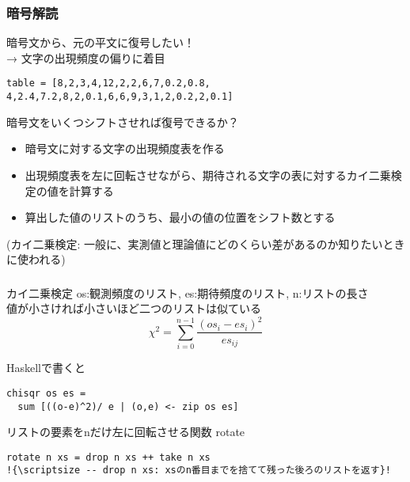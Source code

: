 \documentclass[dvipdfmx,cjk,xcolor=dvipsnames,envcountsect,notheorems,12pt]{beamer}
\theoremstyle{definition}
\begin{document}
\begin{frame}[fragile]
\frametitle{暗号解読}
暗号文から、元の平文に復号したい！
\\ → 文字の出現頻度の偏りに着目
\vfill
\begin{lstlisting}
table = [8,2,3,4,12,2,2,6,7,0.2,0.8,
4,2.4,7.2,8,2,0.1,6,6,9,3,1,2,0.2,2,0.1]
\end{lstlisting}
\vfill
\begin{block}{暗号文をいくつシフトさせれば復号できるか？}
\begin{itemize}
\item 暗号文に対する文字の出現頻度表を作る
\item 出現頻度表を左に回転させながら、期待される文字の表に対するカイ二乗検定の値を計算する
\item 算出した値のリストのうち、最小の値の位置をシフト数とする
\end{itemize}
\vfill
{\scriptsize (カイ二乗検定: 一般に、実測値と理論値にどのくらい差があるのか知りたいときに使われる)}
\end{block}
\end{frame}

\begin{frame}[fragile]
\frametitle{}
\begin{block}{カイ二乗検定}
{\footnotesize os:観測頻度のリスト, es:期待頻度のリスト, n:リストの長さ}
\\{\footnotesize 値が小さければ小さいほど二つのリストは似ている}
\begin{equation*}
\chi^2 ={\displaystyle \sum_{i = 0}^{n-1}} \frac{(os_{i} - es_{i})^2}{es_{ij}}
\end{equation*}
\end{block}
Haskellで書くと
\begin{lstlisting}[escapechar=!]
chisqr os es =
  sum [((o-e)^2)/ e | (o,e) <- zip os es]
\end{lstlisting}
リストの要素をnだけ左に回転させる関数 rotate
\begin{lstlisting}[escapechar=!]
rotate n xs = drop n xs ++ take n xs
!{\scriptsize -- drop n xs: xsのn番目までを捨てて残った後ろのリストを返す}!
\end{lstlisting}
\end{frame}
\end{document}
